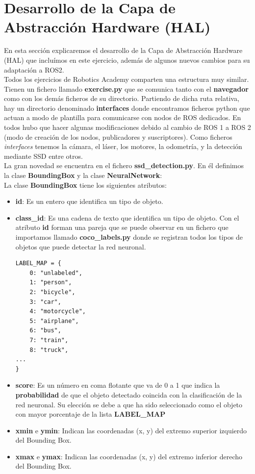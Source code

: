 \section{Desarrollo de la Capa de Abstracción Hardware (HAL)}
\label{sec:turtlebot2_hal_simulado}

En esta sección explicaremos el desarrollo de la Capa de Abstracción Hardware (HAL) que incluímos en este ejercicio, además de algunos nuevos cambios para su adaptación a ROS2.\\

Todos los ejercicios de Robotics Academy comparten una estructura muy similar. Tienen un fichero llamado \textbf{exercise.py} que se comunica tanto con el \textbf{navegador} como con los demás ficheros de su directorio. Partiendo de dicha ruta relativa, hay un directorio denominado \textbf{interfaces} donde encontramos ficheros python que actuan a modo de plantilla para comunicarse con nodos de ROS dedicados. En todos hubo que hacer algunas modificaciones debido al cambio de ROS 1 a ROS 2 (modo de creación de los nodos, publicadores y suscriptores). Como ficheros \textit{interfaces} tenemos la cámara, el láser, los motores, la odometría, y la detección mediante SSD entre otros.\\

La gran novedad se encuentra en el fichero \textbf{ssd\_detection.py}. En él definimos la clase \textbf{BoundingBox} y la clase \textbf{NeuralNetwork}:\\

La clase \textbf{BoundingBox} tiene los siguientes atributos:
\begin{itemize}
	\item \textbf{id}: Es un entero que identifica un tipo de objeto.
	\item \textbf{class\_id}: Es una cadena de texto que identifica un tipo de objeto. Con el atributo \textbf{id} forman una pareja que se puede observar en un fichero que importamos llamado \textbf{coco\_labels.py} donde se registran todos los tipos de objetos que puede detectar la red neuronal.
\begin{lstlisting}
LABEL_MAP = {
    0: "unlabeled",
    1: "person",
    2: "bicycle",
    3: "car",
    4: "motorcycle",
    5: "airplane",
    6: "bus",
    7: "train",
    8: "truck",
...
}
\end{lstlisting}
	\item \textbf{score}: Es un número en coma flotante que va de 0 a 1 que indica la \textbf{probabilidad} de que el objeto detectado coincida con la clasificación de la red neuronal. Su elección se debe a que ha sido seleccionado como el objeto con mayor porcentaje de la lista \textbf{LABEL\_MAP}
	\item \textbf{xmin} e \textbf{ymin}: Indican las coordenadas (x, y) del extremo superior izquierdo del Bounding Box.
	\item \textbf{xmax} e \textbf{ymax}: Indican las coordenadas (x, y) del extremo inferior derecho del Bounding Box.
\end{itemize}

